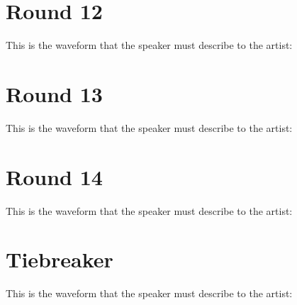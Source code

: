\documentclass[12pt]{article}
\begin{document}
\newpage
\section*{Round 12}
\vspace{5mm}
This is the waveform that the speaker must describe to the artist:

\newpage
\section*{Round 13}
\vspace{5mm}
This is the waveform that the speaker must describe to the artist:

\newpage
\section*{Round 14}
\vspace{5mm}
This is the waveform that the speaker must describe to the artist:

\newpage
\section*{Tiebreaker}
\vspace{5mm}
This is the waveform that the speaker must describe to the artist:
\end{document}
